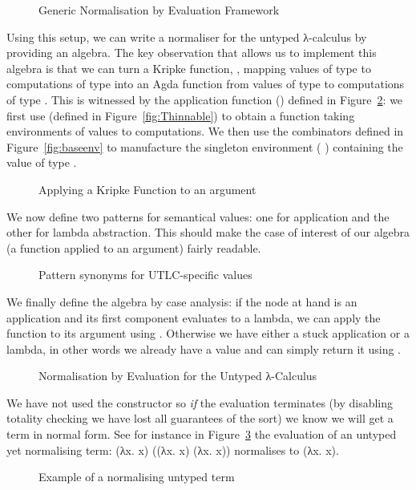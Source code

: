 \begin{figure}[h]
\caption{Generic Normalisation by Evaluation Framework\label{defn:NbE}}
\end{figure}

Using this setup, we can write a normaliser for the untyped λ-calculus
by providing an algebra. The key observation that allows us to implement
this algebra is that we can turn a Kripke function, , mapping values
of type  to computations of type  into an Agda function from
values of type  to computations of type . This is witnessed
by the application function (\AF{\_\$\$\_}) defined in Figure~\ref{fig:kripkeapp}:
we first use  (defined in Figure~\ref{fig:Thinnable}) to obtain
a function taking environments of values to computations. We then use the
combinators defined in Figure~\ref{fig:baseenv} to manufacture the singleton
environment {(  )} containing the value  of type
.

\begin{figure}[h]
\caption{Applying a Kripke Function to an argument}\label{fig:kripkeapp}
\end{figure}

We now define two patterns for semantical values: one for application and
the other for lambda abstraction. This should make the case of interest of
our algebra (a function applied to an argument) fairly readable.

\begin{figure}[h]
\caption{Pattern synonyms for UTLC-specific  values}
\end{figure}

We finally define the algebra by case analysis: if the node at hand is an
application and its first component evaluates to a lambda, we can apply
the function to its argument using \AF{\_\$\$\_}. Otherwise we have either a
stuck application or a lambda, in other words we already have a value and can
simply return it using .

\begin{figure}[h]
\caption{Normalisation by Evaluation for the Untyped λ-Calculus}
\end{figure}

We have not used the  constructor so \emph{if} the evaluation terminates
(by disabling totality checking we have lost all guarantees of the sort) we know
we will get a term in normal form. See for instance in
Figure~\ref{fig:normuntyped} the evaluation of an untyped yet normalising
term: {(λx. x) ((λx. x) (λx. x))} normalises to {(λx. x)}.

\begin{figure}[h]
\caption{Example of a normalising untyped term}
\label{fig:normuntyped}
\end{figure}
